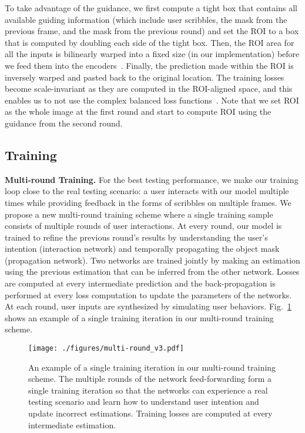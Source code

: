 \documentclass[10pt,twocolumn,letterpaper]{article}
\newcommand{\fref}[1]{Fig.~\ref{#1}}
\renewcommand{\paragraph}[1]{\vspace{1mm}\noindent\textbf{#1}}
\begin{document}
To take advantage of the guidance, we first compute a tight box that contains all available guiding information (which include user scribbles, the mask from the previous frame, and the mask from the previous round) and set the ROI to a box that is computed by doubling each side of the tight box.
Then, the ROI area for all the inputs is bilinearly warped into a fixed size (\eg  in our implementation) before we feed them into the encoders~\cite{jaderberg2015spatial, he2017mask}.
Finally, the prediction made within the ROI is inversely warped and pasted back to the original location.
The training losses become scale-invariant as they are computed in the ROI-aligned space, and this enables us to not use the complex balanced loss functions~\cite{caelles2017one}. Note that we set ROI as the whole image at the first round and start to compute ROI using the guidance from the second round. 




\subsection{Training}

\paragraph{Multi-round Training.} 
For the best testing performance, we make our training loop close to the real testing scenario: a user interacts with our model multiple times while providing feedback in the forms of scribbles on multiple frames. 
We propose a new multi-round training scheme where a single training sample consists of multiple rounds of user interactions. 
At every round, our model is trained to refine the previous round's results by understanding the user's intention (interaction network) and temporally propagating the object mask (propagation network).
Two networks are trained jointly by making an estimation using the previous estimation that can be inferred from the other network. 
Losses are computed at every intermediate prediction and the back-propagation is performed at every loss computation to update the parameters of the networks. 
At each round, user inputs are synthesized by simulating user behaviors. 
\fref{Fig:multi-round} shows an example of a single training iteration in our multi-round training scheme. 


\begin{figure}
\centering
\texttt{[image: ./figures/multi-round\_v3.pdf]}
\caption{An example of a single training iteration in our multi-round training scheme. The multiple rounds of the network feed-forwarding form a single training iteration so that the networks can experience a real testing scenario and learn how to understand user intention and update incorrect estimations. Training losses are computed at every intermediate estimation.}
\label{Fig:multi-round}
\end{figure}
\end{document}
